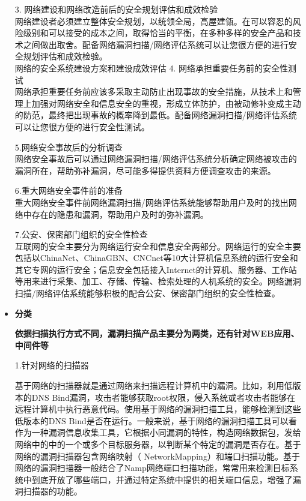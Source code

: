 \documentclass{article}
\begin{document}
\begin{itemize}
    3. 网络建设和网络改造前后的安全规划评估和成效检验\\
    网络建设者必须建立整体安全规划，以统领全局，高屋建瓴。在可以容忍的风险级别和可以接受的成本之间，取得恰当的平衡，在多种多样的安全产品和技术之间做出取舍。配备网络漏洞扫描/网络评估系统可以让您很方便的进行安全规划评估和成效检验。\\
    网络的安全系统建设方案和建设成效评估
    4. 网络承担重要任务前的安全性测试\\
    网络承担重要任务前应该多采取主动防止出现事故的安全措施，从技术上和管理上加强对网络安全和信息安全的重视，形成立体防护，由被动修补变成主动的防范，最终把出现事故的概率降到最低。配备网络漏洞扫描/网络评估系统可以让您很方便的进行安全性测试。\par
    5.网络安全事故后的分析调查\\
    网络安全事故后可以通过网络漏洞扫描/网络评估系统分析确定网络被攻击的漏洞所在，帮助弥补漏洞，尽可能多得提供资料方便调查攻击的来源。\par
    6.重大网络安全事件前的准备\\
    重大网络安全事件前网络漏洞扫描/网络评估系统能够帮助用户及时的找出网络中存在的隐患和漏洞，帮助用户及时的弥补漏洞。\par
    7.公安、保密部门组织的安全性检查\\
    互联网的安全主要分为网络运行安全和信息安全两部分。网络运行的安全主要包括以ChinaNet、ChinaGBN、CNCnet等10大计算机信息系统的运行安全和其它专网的运行安全；信息安全包括接入Internet的计算机、服务器、工作站等用来进行采集、加工、存储、传输、检索处理的人机系统的安全。网络漏洞扫描/网络评估系统能够积极的配合公安、保密部门组织的安全性检查。\citep{Fonseca2008Testing}\par
    \item {\bf 分类}\par
    {\bf 依据扫描执行方式不同，漏洞扫描产品主要分为两类，还有针对WEB应用、中间件等}\par
    1.针对网络的扫描器\par
    基于网络的扫描器就是通过网络来扫描远程计算机中的漏洞。比如，利用低版本的DNS Bind漏洞，攻击者能够获取root权限，侵入系统或者攻击者能够在远程计算机中执行恶意代码。使用基于网络的漏洞扫描工具，能够检测到这些低版本的DNS Bind是否在运行。一般来说，基于网络的漏洞扫描工具可以看作为一种漏洞信息收集工具，它根据小同漏洞的特性，构造网络数据包，发给网络中的中的一个或多个目标服务器，以判断某个特定的漏洞是否存在。基于网络的漏洞扫描器包含网络映射（ NetworkMapping）和端口扫描功能。基于网络的漏洞扫描器一般结合了Namp网络端口扫描功能，常常用来检测目标系统中到底开放了哪些端口，并通过特定系统中提供的相关端口信息，增强了漏洞扫描器的功能。\par

\end{itemize}
\end{document}
